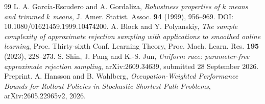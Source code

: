 \begin{thebibliography}{99}
 L. A. Garc\'ia-Escudero and A. Gordaliza, \emph{Robustness properties of $k$ means and trimmed $k$ means}, J. Amer. Statist. Assoc. \textbf{94} (1999), 956--969. DOI: 10.1080/01621459.1999.10474200.
 A. Block and Y. Polyanskiy, \emph{The sample complexity of approximate rejection sampling with applications to smoothed online learning}, Proc. Thirty-sixth Conf. Learning Theory, Proc. Mach. Learn. Res. \textbf{195} (2023), 228--273.
 S. Shin, J. Pang and K.-S. Jun, \emph{Uniform race: parameter-free approximate rejection sampling}, arXiv:2609.34639, submitted 28 September 2026. Preprint.
 A. Hansson and B. Wahlberg, \emph{Occupation-Weighted Performance Bounds for Rollout Policies in Stochastic Shortest Path Problems}, arXiv:2605.22965v2, 2026.
\end{thebibliography}
